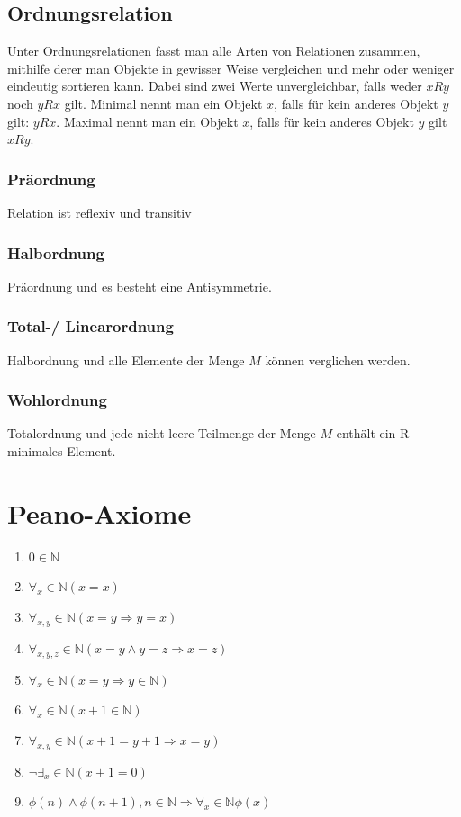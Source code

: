 \documentclass{article}
\begin{document}
\subsection{Ordnungsrelation}
Unter Ordnungsrelationen fasst man alle Arten von Relationen zusammen, mithilfe derer man Objekte in gewisser Weise vergleichen und mehr oder weniger eindeutig sortieren kann. Dabei sind zwei Werte unvergleichbar, falls weder $xRy$ noch $yRx$ gilt. Minimal nennt man ein Objekt $x$, falls für kein anderes Objekt $y$ gilt: $yRx$.
Maximal nennt man ein Objekt $x$, falls für kein anderes Objekt $y$ gilt $xRy$.
\subsubsection{Präordnung}
Relation ist reflexiv und transitiv
\subsubsection{Halbordnung}
Präordnung und es besteht eine Antisymmetrie.
\subsubsection{Total-/ Linearordnung}
Halbordnung und alle Elemente der Menge $M$ können verglichen werden.
\subsubsection{Wohlordnung}
Totalordnung und jede nicht-leere Teilmenge der Menge $M$ enthält ein R-minimales Element.
\newpage
\section{Peano-Axiome}
\begin{enumerate}
		\item	$0 \in \mathbb{N}$
		\item $\forall_x \in \mathbb{N}(x=x)$
		\item $\forall_{x,y} \in \mathbb{N}(x=y \Rightarrow y=x)$
		\item $\forall_{x,y,z} \in \mathbb{N}(x=y \land y=z \Rightarrow x=z)$
		\item $\forall_x \in \mathbb{N}(x=y\Rightarrow y \in \mathbb{N})$
		\item $\forall_x \in \mathbb{N} (x+1 \in \mathbb{N})$
		\item $\forall_{x,y} \in \mathbb{N} (x+1=y+1 \Rightarrow x=y)$
		\item $\neg \exists_x \in \mathbb{N}(x+1 = 0)$
		\item $\phi(n) \land \phi(n+1), n \in \mathbb{N} \Rightarrow \forall_x \in \mathbb{N} \phi(x)$
\end{enumerate}
\end{document}
